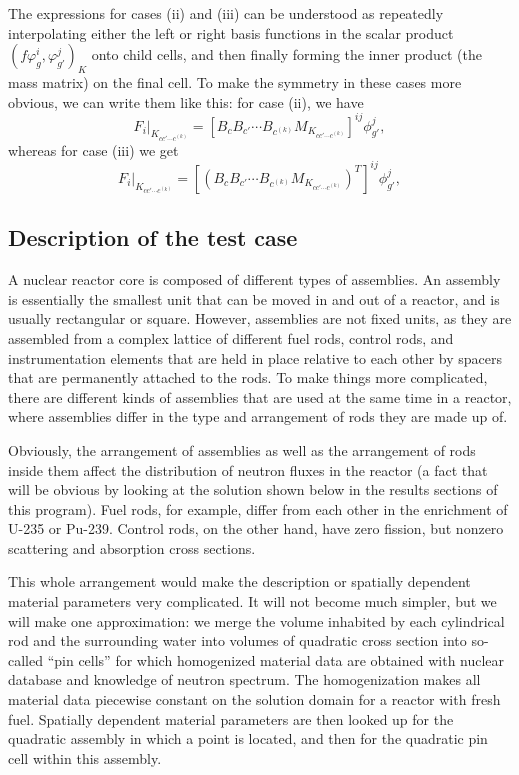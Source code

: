 \documentclass{article}
\begin{document}
The expressions for cases (ii) and (iii) can be understood as repeatedly
interpolating either the left or right basis functions in the scalar product
$(f \varphi_g^i, \varphi_{g'}^j)_K$ onto child cells, and then finally
forming the inner product (the mass matrix) on the final cell. To make the
symmetry in these cases more obvious, we can write them like this: for case
(ii), we have
\begin{equation}
  F_i|_{K_{cc'\cdots c^{(k)}}}
  = [B_c B_{c'} \cdots B_{c^{(k)}} M_{K_{cc'\cdots c^{(k)}}}]^{ij}
    \phi_{g'}^j,
\end{equation}
whereas for case (iii) we get
\begin{equation}
  F_i|_{K_{cc'\cdots c^{(k)}}}
  = [(B_c B_{c'} \cdots B_{c^{(k)}} M_{K_{cc'\cdots c^{(k)}}})^T]^{ij}
    \phi_{g'}^j,
\end{equation}



\subsection{Description of the test case}

A nuclear reactor core is composed of different types of assemblies. An
assembly is essentially the smallest unit that can be moved in and out of a
reactor, and is usually rectangular or square. However, assemblies are not
fixed units, as they are assembled from a complex lattice of different fuel
rods, control rods, and instrumentation elements that are held in place
relative to each other by spacers that are permanently attached to the rods.
To make things more complicated, there are different kinds of assemblies that
are used at the same time in a reactor, where assemblies differ in the type
and arrangement of rods they are made up of.

Obviously, the arrangement of assemblies as well as the arrangement of rods
inside them affect the distribution of neutron fluxes in the reactor (a fact
that will be obvious by looking at the solution shown below in the results
sections of this program). Fuel rods, for example, differ from each other in
the enrichment of U-235 or Pu-239. Control rods, on the other hand, have zero
fission, but nonzero scattering and absorption cross sections.

This whole arrangement would make the description or spatially dependent
material parameters very complicated. It will not become much simpler, but we
will make one approximation: we merge the volume inhabited by each cylindrical
rod and the surrounding water into volumes of quadratic cross section into
so-called ``pin cells'' for which homogenized material data are obtained with
nuclear database and knowledge of neutron spectrum. The homogenization makes
all material data piecewise constant on the solution domain for a reactor with
fresh fuel. Spatially dependent material parameters are then looked up for the
quadratic assembly in which a point is located, and then for the quadratic pin
cell within this assembly.
\end{document}
